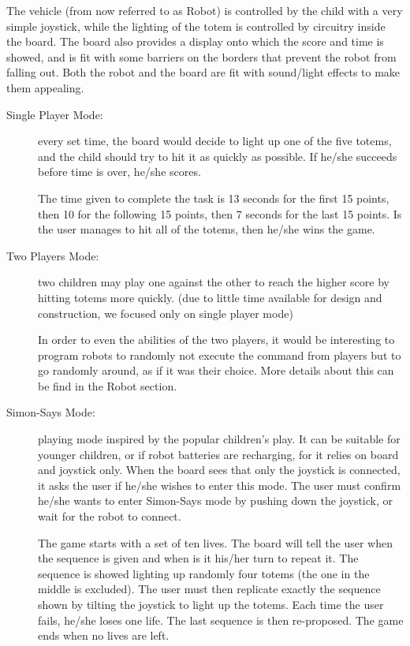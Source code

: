\documentclass[a4paper,twoside]{book}
\begin{document}
\beforelist* The vehicle (from now referred to as Robot) is controlled by the child with a very simple joystick, while the lighting of the totem is controlled by circuitry inside the board. The board also provides a display onto which the score and time is showed, and is fit with some barriers on the borders that prevent the robot from falling out. Both the robot and the board are fit with sound/light effects to make them appealing.
\begin{description}
\item[Single Player Mode:] every set time, the board would decide to light up one of the five totems, and the child should try to hit it as quickly as possible. If he/she succeeds before time is over, he/she scores.

The time given to complete the task is 13 seconds for the first 15 points, then 10 for the following 15 points, then 7 seconds for the last 15 points. Is the user manages to hit all of the totems, then he/she wins the game.

\item[Two Players Mode:] two children may play one against the other to reach the higher score by hitting totems more quickly.
(due to little time available for  design and construction, we focused only on single player mode)

In order to even the abilities of the two players, it would be interesting to program robots to randomly not execute the command from players but to go randomly around, as if it was their choice. More details about this can be find in the Robot section.

\item[Simon-Says Mode:] playing mode inspired by the popular children's play. It can be suitable for younger children, or if robot batteries are recharging, for it relies on board and joystick only. When the board sees that only the joystick is connected, it asks the user if he/she wishes to enter this mode. The user must confirm he/she wants to enter Simon-Says mode by pushing down the joystick, or wait for the robot to connect. 

The game starts with a set of ten lives. The board will tell the user when the sequence is given and when is it his/her turn to repeat it. The sequence is showed lighting up randomly four totems (the one in the middle is excluded). The user must then replicate exactly the sequence shown by tilting the joystick to light up the totems. Each time the user fails, he/she loses one life. The last sequence is then re-proposed.  The game ends when no lives are left.


\end{description}
\end{document}
